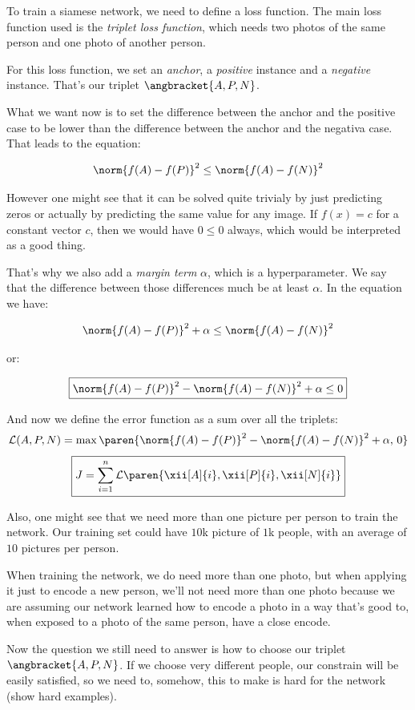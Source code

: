 \documentclass[12pt, a4paper, oneside]{book}
\begin{document}
To train a siamese network, we need to define a loss function. The main loss
function used is the \textit{triplet loss function}, which needs two photos of
the same person and one photo of another person.

For this loss function, we set an \textit{anchor}, a \textit{positive} instance
and a \textit{negative} instance. That's our triplet $\angbracket{A, P, N}$.

What we want now is to set the difference between the anchor and the positive case
to be lower than the difference between the anchor and the negativa case. That
leads to the equation:

\[
\norm{f(A)-f(P)}^2 \leq \norm{f(A)-f(N)}^2
\]

However one might see that it can be solved quite trivialy by just predicting
zeros or actually by predicting the same value for any image. If $f(x) = c$ for
a constant vector $c$, then we would have $0\leq 0$ always, which would be
interpreted as a good thing.

That's why we also add a \textit{margin term} $\alpha$, which is a
hyperparameter. We say that the difference between those differences much be at
least $\alpha$. In the equation
we have:

\[
\norm{f(A)-f(P)}^2 + \alpha \leq \norm{f(A)-f(N)}^2
\]

or:

\[ \boxed{
\norm{f(A)-f(P)}^2 - \norm{f(A)-f(N)}^2 + \alpha \leq 0
}\]

And now we define the error function as a sum over all the triplets:
\[
\mathcal{L}(A, P, N) = \max\paren{
    \norm{f(A)-f(P)}^2 - \norm{f(A)-f(N)}^2 + \alpha, \,0
}
\]
\[ \boxed{
J=\sum_{i=1}^{n} \mathcal{L}\paren{\xii[A]{i}, \xii[P]{i}, \xii[N]{i}}
}\]

Also, one might see that we need more than one picture per person to train the
network. Our training set could have $10$k picture of $1$k people, with an
average of $10$ pictures per person.

When training the network, we do need more than one photo, but when applying it
just to encode a new person, we'll not need more than one photo because we are
assuming our network learned how to encode a photo in a way that's good to, when
exposed to a photo of the same person, have a close encode.

\jump

Now the question we still need to answer is how to choose our triplet
$\angbracket{A, P, N}$. If we choose very different people, our constrain will
be easily satisfied, so we need to, somehow, this to make is hard for the
network (show hard examples).
\end{document}
